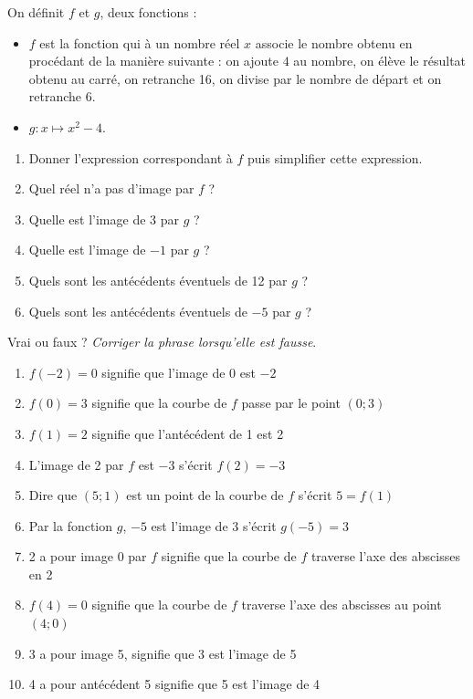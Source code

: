 \begin{multicols}{2}
\begin{exo}
On d\'efinit $f$ et $g$, deux fonctions :
\begin{itemize}
	\item $f$ est la fonction qui \`a un nombre r\'eel $x$ associe le nombre obtenu en proc\'edant de la mani\`ere suivante : on ajoute $4$ au nombre, on \'el\`eve le r\'esultat obtenu au carr\'e, on retranche 16, on divise par le nombre de d\'epart et on retranche 6.
	\item $g:x\mapsto x^2-4$.
\end{itemize}
\begin{enumerate}
	\item Donner l'expression correspondant \`a $f$ puis simplifier cette expression.
	\item Quel r\'eel n'a pas d'image par $f$ ?
	\item Quelle est l'image de 3 par $g$ ?
	\item Quelle est l'image de $-1$ par $g$ ?
	\item Quels sont les ant\'ec\'edents \'eventuels de 12 par $g$ ?
	\item Quels sont les ant\'ec\'edents \'eventuels de $-5$ par $g$ ?
\end{enumerate}
\end{exo}

\sautcol

\begin{exo}
Vrai ou faux ? \emph{Corriger la phrase lorsqu'elle est fausse}.
\begin{enumerate}
	\item $f(-2) = 0$ signifie que l'image de 0 est $-2$
	\item $f(0) = 3$ signifie que la courbe de $f$ passe par le point $(0 ; 3)$
	\item $f(1) = 2$ signifie que l'ant\'ec\'edent de 1 est 2
	\item L'image de 2 par $f$ est $-3$ s'\'ecrit $f(2) = -3$
	\item Dire que $(5 ; 1)$ est un point de la courbe de $f$ s'\'ecrit $5 = f(1)$
	\item Par la fonction $g$, $-5$ est l'image de 3 s'\'ecrit $g(-5) = 3$
	\item 2 a pour image 0 par $f$ signifie que la courbe de $f$ traverse l'axe des abscisses en 2
	\item $f(4) = 0$ signifie que la courbe de $f$ traverse l'axe des abscisses au point $(4 ; 0)$
	\item 3 a pour image 5, signifie que 3 est l'image de 5
	\item 4 a pour ant\'ec\'edent 5 signifie que 5 est l'image de 4
\end{enumerate}
\end{exo}

\end{multicols}

